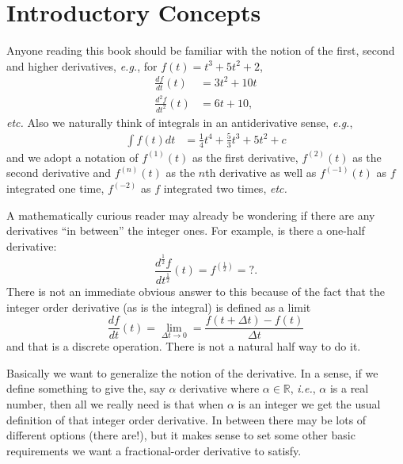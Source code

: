\section{Introductory Concepts}
Anyone reading this book should be familiar with the notion of the first, second and higher derivatives, \textit{e.g.}, for $f(t) = t^3 + 5 t^2 + 2$, 
\begin{align}
  \frac{df}{dt}(t) &= 3 t^2 + 10 t \\
  \frac{d^2f}{dt^2}(t) &= 6t + 10, 
  \label{eq:derivs}
\end{align}
\textit{etc.} Also we naturally think of integrals in an antiderivative sense, \textit{e.g.},
\begin{align}
  \int f(t) dt &= \frac{1}{4} t^4 + \frac{5}{3} t^3 + 5 t^2 + c 
  \label{eq:integrals}
\end{align}
and we adopt a notation of $f^{(1)}(t)$ as the first derivative, $f^{(2)}(t)$ as the second derivative and $f^{(n)}(t)$ as the $n$th derivative as well as $f^{(-1)}(t)$ as $f$ integrated one time, $f^{(-2)}$ as $f$ integrated two times, \textit{etc.}

A mathematically curious reader may already be wondering if there are any derivatives ``in between'' the integer ones.
For example, is there a one-half derivative:
\begin{equation}
  \frac{d^\frac{1}{2} f}{d t^\frac{1}{2}}(t) = f^{\left(\frac{1}{2}\right)} = ?.
  \label{eq:halfderiv}
\end{equation}
There is not an immediate obvious answer to this because of the fact that the integer order derivative (as is the integral) is defined as a limit
\begin{equation}
  \frac{df}{dt}(t) = \lim_{\Delta t \rightarrow 0} = \frac{f\left(t + \Delta t \right) - f\left(t\right)}{\Delta t}
  \label{eq:limdef}
\end{equation}
and that is a discrete operation. There is not a natural half way to do it.

Basically we want to generalize the notion of the derivative. In a sense, if we define something to give the, say $\alpha$ derivative where $\alpha \in \mathbb R$, \textit{i.e.}, $\alpha$ is a real number, then all we really need is that when $\alpha$ is an integer we get the usual definition of that integer order derivative. In between there may be lots of different options (there are!), but it makes sense to set some other basic requirements we want a fractional-order derivative to satisfy.

